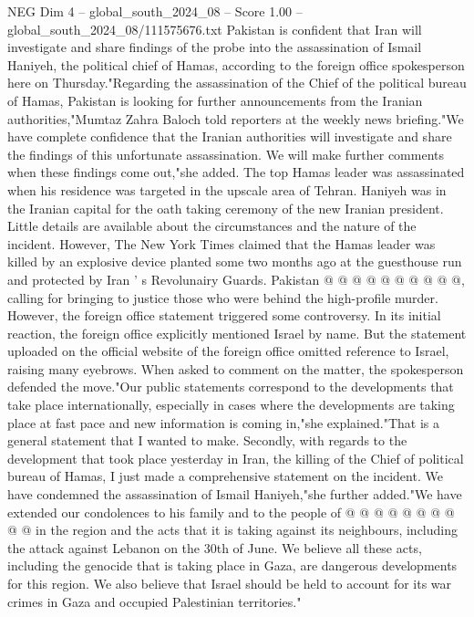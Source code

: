 \begin{textsample}{NEG Dim 4 – global\_south\_2024\_08 – Score 1.00 – global\_south\_2024\_08/111575676.txt}  \label{ex:f4_neg_336}
Pakistan is confident that Iran will investigate and share findings of the probe into the assassination of Ismail Haniyeh, the political chief of Hamas, according to the foreign office spokesperson here on Thursday."Regarding the assassination of the Chief of the political bureau of Hamas, Pakistan is looking for further announcements from the Iranian authorities,"Mumtaz Zahra Baloch told reporters at the weekly news briefing."We have complete confidence that the Iranian authorities will investigate and share the findings of this unfortunate assassination.
We will make further comments when these findings come out,"she added.
The top Hamas leader was assassinated when his residence was targeted in the upscale area of Tehran.
Haniyeh was in the Iranian capital for the oath taking ceremony of the new Iranian president.
Little details are available about the circumstances and the nature of the incident.
However, The New York Times claimed that the Hamas leader was killed by an explosive device planted some two months ago at the guesthouse run and protected by Iran ' s Revolunairy Guards.
Pakistan @ @ @ @ @ @ @ @ @ @, calling for bringing to justice those who were behind the high-profile murder.
However, the foreign office statement triggered some controversy.
In its initial reaction, the foreign office explicitly mentioned Israel by name.
But the statement uploaded on the official website of the foreign office omitted reference to Israel, raising many eyebrows.
When asked to comment on the matter, the spokesperson defended the move."Our public statements correspond to the developments that take place internationally, especially in cases where the developments are taking place at fast pace and new information is coming in,"she explained."That is a general statement that I wanted to make.
Secondly, with regards to the development that took place yesterday in Iran, the killing of the Chief of political bureau of Hamas, I just made a comprehensive statement on the incident.
We have condemned the assassination of Ismail Haniyeh,"she further added."We have extended our condolences to his family and to the people of @ @ @ @ @ @ @ @ @ @ in the region and the acts that it is taking against its neighbours, including the attack against Lebanon on the 30th of June.
We believe all these acts, including the genocide that is taking place in Gaza, are dangerous developments for this region.
We also believe that Israel should be held to account for its war crimes in Gaza and occupied Palestinian territories."

\end{textsample}
